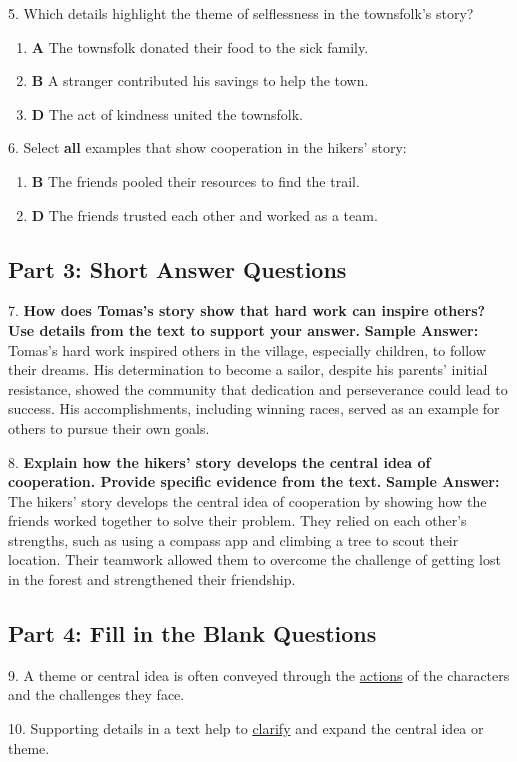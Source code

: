 \documentclass[12pt]{article}
\begin{document}
5. Which details highlight the theme of selflessness in the townsfolk’s story?
\begin{enumerate}[label=\Alph*.]
    \item \textbf{A} The townsfolk donated their food to the sick family.
    \item \textbf{B} A stranger contributed his savings to help the town.
    \item \textbf{D} The act of kindness united the townsfolk.
\end{enumerate}

6. Select \textbf{all} examples that show cooperation in the hikers’ story:
\begin{enumerate}[label=\Alph*.]
    \item \textbf{B} The friends pooled their resources to find the trail.
    \item \textbf{D} The friends trusted each other and worked as a team.
\end{enumerate}

\subsection*{Part 3: Short Answer Questions}

7. \textbf{How does Tomas’s story show that hard work can inspire others? Use details from the text to support your answer.}
\textbf{Sample Answer:} Tomas’s hard work inspired others in the village, especially children, to follow their dreams. His determination to become a sailor, despite his parents’ initial resistance, showed the community that dedication and perseverance could lead to success. His accomplishments, including winning races, served as an example for others to pursue their own goals.

8. \textbf{Explain how the hikers’ story develops the central idea of cooperation. Provide specific evidence from the text.}
\textbf{Sample Answer:} The hikers’ story develops the central idea of cooperation by showing how the friends worked together to solve their problem. They relied on each other’s strengths, such as using a compass app and climbing a tree to scout their location. Their teamwork allowed them to overcome the challenge of getting lost in the forest and strengthened their friendship.

\subsection*{Part 4: Fill in the Blank Questions}

9. A theme or central idea is often conveyed through the \underline{actions} of the characters and the challenges they face.

10. Supporting details in a text help to \underline{clarify} and expand the central idea or theme.
\end{document}

